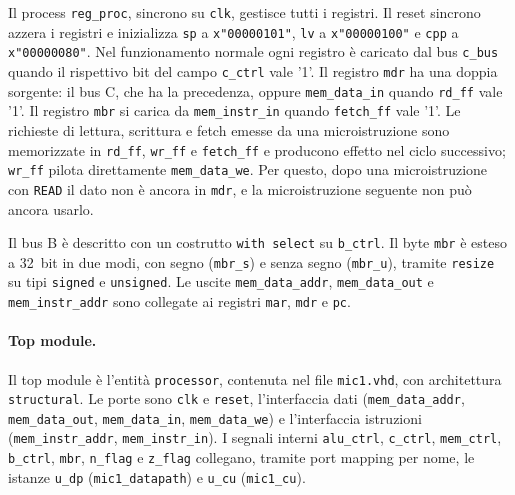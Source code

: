 Il process \texttt{reg\_proc}, sincrono su \texttt{clk}, gestisce tutti i registri. Il reset sincrono azzera i registri e inizializza \texttt{sp} a \texttt{x"00000101"}, \texttt{lv} a \texttt{x"00000100"} e \texttt{cpp} a \texttt{x"00000080"}. Nel funzionamento normale ogni registro è caricato dal bus \texttt{c\_bus} quando il rispettivo bit del campo \texttt{c\_ctrl} vale '1'. Il registro \texttt{mdr} ha una doppia sorgente: il bus C, che ha la precedenza, oppure \texttt{mem\_data\_in} quando \texttt{rd\_ff} vale '1'. Il registro \texttt{mbr} si carica da \texttt{mem\_instr\_in} quando \texttt{fetch\_ff} vale '1'. Le richieste di lettura, scrittura e fetch emesse da una microistruzione sono memorizzate in \texttt{rd\_ff}, \texttt{wr\_ff} e \texttt{fetch\_ff} e producono effetto nel ciclo successivo; \texttt{wr\_ff} pilota direttamente \texttt{mem\_data\_we}. Per questo, dopo una microistruzione con \texttt{READ} il dato non è ancora in \texttt{mdr}, e la microistruzione seguente non può ancora usarlo.

Il bus B è descritto con un costrutto \texttt{with select} su \texttt{b\_ctrl}. Il byte \texttt{mbr} è esteso a \SI{32}{bit} in due modi, con segno (\texttt{mbr\_s}) e senza segno (\texttt{mbr\_u}), tramite \texttt{resize} su tipi \texttt{signed} e \texttt{unsigned}. Le uscite \texttt{mem\_data\_addr}, \texttt{mem\_data\_out} e \texttt{mem\_instr\_addr} sono collegate ai registri \texttt{mar}, \texttt{mdr} e \texttt{pc}.


\paragraph{Top module.}
Il top module è l'entità \texttt{processor}, contenuta nel file \texttt{mic1.vhd}, con architettura \texttt{structural}. Le porte sono \texttt{clk} e \texttt{reset}, l'interfaccia dati (\texttt{mem\_data\_addr}, \texttt{mem\_data\_out}, \texttt{mem\_data\_in}, \texttt{mem\_data\_we}) e l'interfaccia istruzioni (\texttt{mem\_instr\_addr}, \texttt{mem\_instr\_in}). I segnali interni \texttt{alu\_ctrl}, \texttt{c\_ctrl}, \texttt{mem\_ctrl}, \texttt{b\_ctrl}, \texttt{mbr}, \texttt{n\_flag} e \texttt{z\_flag} collegano, tramite port mapping per nome, le istanze \texttt{u\_dp} (\texttt{mic1\_datapath}) e \texttt{u\_cu} (\texttt{mic1\_cu}).


